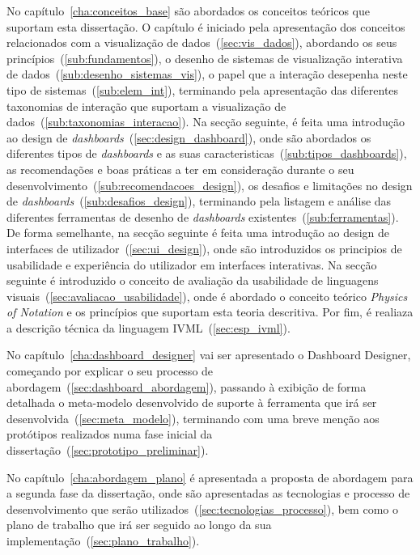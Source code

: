 No capítulo~\ref{cha:conceitos_base} são abordados os conceitos teóricos que suportam esta dissertação. O capítulo é iniciado pela apresentação dos conceitos relacionados com a visualização de dados~(\ref{sec:vis_dados}), abordando os seus princípios~(\ref{sub:fundamentos}), o desenho de sistemas de visualização interativa de dados~(\ref{sub:desenho_sistemas_vis}), o papel que a interação desepenha neste tipo de sistemas~(\ref{sub:elem_int}), terminando pela apresentação das diferentes taxonomias de interação que suportam a visualização de dados~(\ref{sub:taxonomias_interacao}). Na secção seguinte, é feita uma introdução ao design de \textit{dashboards}~(\ref{sec:design_dashboard}), onde são abordados os diferentes tipos de \textit{dashboards} e as suas caracteristicas~(\ref{sub:tipos_dashboards}), as recomendações e boas práticas a ter em consideração durante o seu desenvolvimento~(\ref{sub:recomendacoes_design}), os desafios e limitações no design de \textit{dashboards}~(\ref{sub:desafios_design}), terminando pela listagem e análise das diferentes ferramentas de desenho de \textit{dashboards} existentes~(\ref{sub:ferramentas}). De forma semelhante, na secção seguinte é feita uma introdução ao design de interfaces de utilizador~(\ref{sec:ui_design}), onde são introduzidos os principios de usabilidade e experiência do utilizador em interfaces interativas. Na secção seguinte é introduzido o conceito de avaliação da usabilidade de linguagens visuais~(\ref{sec:avaliacao_usabilidade}), onde é abordado o conceito teórico \textit{Physics of Notation} e os princípios que suportam esta teoria descritiva. Por fim, é realiaza a descrição técnica da linguagem IVML~(\ref{sec:esp_ivml}).

No capítulo~\ref{cha:dashboard_designer} vai ser apresentado o Dashboard Designer, começando por explicar o seu processo de abordagem~(\ref{sec:dashboard_abordagem}), passando à exibição de forma detalhada o meta-modelo desenvolvido de suporte à ferramenta que irá ser desenvolvida~(\ref{sec:meta_modelo}), terminando com uma breve menção aos protótipos realizados numa fase inicial da dissertação~(\ref{sec:prototipo_preliminar}).

No capítulo~\ref{cha:abordagem_plano} é apresentada a proposta de abordagem para a segunda fase da dissertação, onde são apresentadas as tecnologias e processo de desenvolvimento que serão utilizados~(\ref{sec:tecnologias_processo}), bem como o plano de trabalho que irá ser seguido ao longo da sua implementação~(\ref{sec:plano_trabalho}). 

